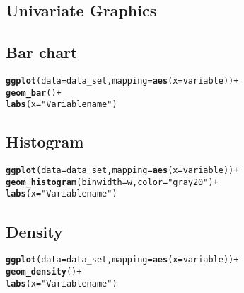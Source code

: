 \documentclass[10pt]{report}\usepackage[]{graphicx}\usepackage[]{color}
\makeatletter
\newcommand{\hlstr}[1]{\textcolor[rgb]{0.192,0.494,0.8}{#1}}%
\newcommand{\hlopt}[1]{\textcolor[rgb]{0,0,0}{#1}}%
\newcommand{\hlstd}[1]{\textcolor[rgb]{0.345,0.345,0.345}{#1}}%
\newcommand{\hlkwc}[1]{\textcolor[rgb]{0.333,0.667,0.333}{#1}}%
\newcommand{\hlkwd}[1]{\textcolor[rgb]{0.737,0.353,0.396}{\textbf{#1}}}%
\newenvironment{kframe}{%
 \def\at@end@of@kframe{}%
 \ifinner\ifhmode%
  \def\at@end@of@kframe{\end{minipage}}%
  \begin{minipage}{\columnwidth}%
 \fi\fi%
 \def\FrameCommand##1{\hskip\@totalleftmargin \hskip-\fboxsep
 \colorbox{shadecolor}{##1}\hskip-\fboxsep
     \hskip-\linewidth \hskip-\@totalleftmargin \hskip\columnwidth}%
 \MakeFramed {\advance\hsize-\width
   \@totalleftmargin\z@ \linewidth\hsize
   \@setminipage}}%
 {\par\unskip\endMakeFramed%
 \at@end@of@kframe}
\newenvironment{knitrout}{}{} %
\makeatother
\begin{document}
\begin{multicols}{2}
\section*{Univariate Graphics}
\subsection*{Bar chart}
\begin{knitrout}\small
{}\color{fgcolor}\begin{kframe}
\begin{alltt}
\hlkwd{ggplot}\hlstd{(}\hlkwc{data} \hlstd{= data_set,} \hlkwc{mapping} \hlstd{=} \hlkwd{aes}\hlstd{(}\hlkwc{x} \hlstd{= variable))} \hlopt{+}
  \hlkwd{geom_bar}\hlstd{()} \hlopt{+}
  \hlkwd{labs}\hlstd{(}\hlkwc{x} \hlstd{=} \hlstr{"Variable name"}\hlstd{)}
\end{alltt}
\end{kframe}
\end{knitrout}
\squeeze
\subsection*{Histogram}
\begin{knitrout}\small
{}\color{fgcolor}\begin{kframe}
\begin{alltt}
\hlkwd{ggplot}\hlstd{(}\hlkwc{data} \hlstd{= data_set,} \hlkwc{mapping} \hlstd{=} \hlkwd{aes}\hlstd{(}\hlkwc{x} \hlstd{= variable))} \hlopt{+}
  \hlkwd{geom_histogram}\hlstd{(}\hlkwc{binwidth} \hlstd{= w,} \hlkwc{color} \hlstd{=} \hlstr{"gray20"}\hlstd{)} \hlopt{+}
  \hlkwd{labs}\hlstd{(}\hlkwc{x} \hlstd{=} \hlstr{"Variable name"}\hlstd{)}
\end{alltt}
\end{kframe}
\end{knitrout}
\squeeze
\subsection*{Density}
\begin{knitrout}\small
{}\color{fgcolor}\begin{kframe}
\begin{alltt}
\hlkwd{ggplot}\hlstd{(}\hlkwc{data} \hlstd{= data_set,} \hlkwc{mapping} \hlstd{=} \hlkwd{aes}\hlstd{(}\hlkwc{x} \hlstd{= variable))} \hlopt{+}
  \hlkwd{geom_density}\hlstd{()} \hlopt{+}
  \hlkwd{labs}\hlstd{(}\hlkwc{x} \hlstd{=} \hlstr{"Variable name"}\hlstd{)}
\end{alltt}
\end{kframe}
\end{knitrout}
\squeeze

\end{multicols}
\end{document}
